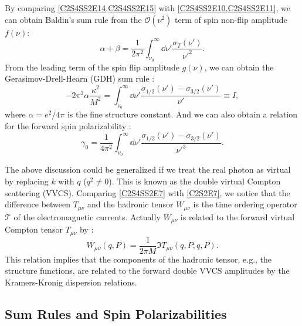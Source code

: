 By comparing \cref{C2S4SS2E14,C2S4SS2E15} with \cref{C2S4SS2E10,C2S4SS2E11}, we can obtain Baldin's sum rule \cite{Baldin1960,Lapidus1963} from the $\mathcal{O}(\nu^2)$ term of spin non-flip amplitude $f(\nu)$:
\begin{equation} \label{C2S4SS2E16}
\alpha+\beta = \frac{1}{2\pi^2}\int_{\nu_0}^\infty\dd{\nu'}\frac{\sigma_T(\nu')}{\nu'^{2}}.
\end{equation}
From the leading term of the spin flip amplitude $g(\nu)$, we can obtain the Gerasimov-Drell-Hearn (GDH) sum rule \cite{Gerasimov1966,Drell1966}:
\begin{equation} \label{C2S4SS2E17}
-2\pi^2\alpha\frac{\kappa^2}{M^2} = \int_{\nu_0}^\infty\dd{\nu'}\frac{\sigma_{1/2}(\nu')-\sigma_{3/2}(\nu')}{\nu'}\equiv I,
\end{equation}
where $\alpha=e^2/4\pi$ is the fine structure constant. And we can also obtain a relation for the forward spin polarizability \cite{Gellmann1954a,Gellmann1954b}:
\begin{equation} \label{C2S4SS2E18}
\gamma_0 = \frac{1}{4\pi^2}\int_{\nu_0}^\infty\dd{\nu'}\frac{\sigma_{1/2}(\nu')-\sigma_{3/2}(\nu')}{\nu'^3}.
\end{equation}

The above discussion could be generalized if we treat the real photon as virtual by replacing $k$ with $q$ ($q^2\neq 0$). This is known as the double virtual Compton scattering (VVCS). Comparing \cref{C2S4SS2E7} with \cref{C2S2E7}, we notice that the difference between $T_{\mu\nu}$ and the hadronic tensor $W_{\mu\nu}$ is the time ordering operator $\mathcal{T}$ of the electromagnetic currents. Actually $W_{\mu\nu}$ is related to the forward virtual Compton tensor $T_{\mu\nu}$ by \cite{Thomas2001}:
\begin{equation} \label{C2S4SS2E19}
W_{\mu\nu}(q,P) = \frac{1}{2\pi M}\Im T_{\mu\nu}(q,P;q,P).
\end{equation}
This relation implies that the components of the hadronic tensor, e.g., the structure functions, are related to the forward double VVCS amplitudes by the Kramers-Kronig dispersion relations.

\subsection{Sum Rules and Spin Polarizabilities}
\label{C2S4SS3}

